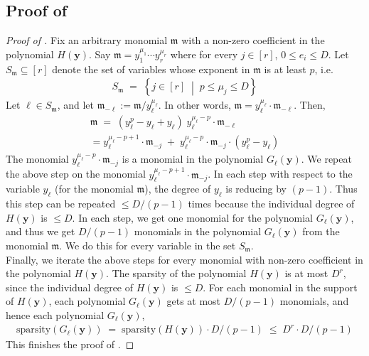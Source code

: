 \documentclass[11pt]{article}
\newcommand{\setcond}[2]{\left\{ #1 \;\middle\vert\; #2 \right\}}
\begin{document}
\subsection{Proof of }\label{app:proof-ind-deg}

\boundedinddegml*

\begin{proof}[Proof of ]
Fix an arbitrary monomial $\mathfrak{m}$ with a non-zero coefficient in the polynomial $H(\mathbf{y})$. Say $\mathfrak{m} = y_{1}^{\mu_{1}} \cdots y_{r}^{\mu_{r}}$ where for every $j \in [r]$, $0 \leq e_{i} \leq D$. Let $S_{\mathfrak{m}} \subseteq [r]$ denote the set of variables whose exponent in $\mathfrak{m}$ is at least $p$, i.e.
\begin{align*}
    S_{\mathfrak{m}} \; = \; \setcond{j \in [r]}{p \leq \mu_{j} \leq D}
\end{align*}
Let $\ell \in S_{\mathfrak{m}}$, and let $\mathfrak{m}_{-\ell} := \mathfrak{m}/y_{\ell}^{\mu_{\ell}}$. In other words, $\mathfrak{m} = y_{\ell}^{\mu_{\ell}} \cdot \mathfrak{m}_{-\ell}$. Then, 
\begin{align*}
    \mathfrak{m} \; = \; (y_{\ell}^{p} - y_{\ell} + y_{\ell}) \; y_{\ell}^{\mu_{\ell} - p} \cdot \mathfrak{m}_{-\ell} \\
    = y_{\ell}^{\mu_{\ell} - p + 1} \cdot \mathfrak{m}_{-j} \; + \; y_{\ell}^{\mu_{\ell} - p} \cdot \mathfrak{m}_{-j} \cdot (y_{\ell}^{p} - y_{\ell})
\end{align*}
The monomial $y_{\ell}^{\mu_{\ell} - p} \cdot \mathfrak{m}_{-j}$ is a monomial in the polynomial $G_{\ell}(\mathbf{y})$. We repeat the above step on the monomial $y_{\ell}^{\mu_{\ell} - p + 1} \cdot \mathfrak{m}_{-j}$. In each step with respect to the variable $y_{\ell}$ (for the monomial $\mathfrak{m}$), the degree of $y_{\ell}$ is reducing by $(p-1)$. Thus this step can be repeated $\leq D/(p-1)$ times because the individual degree of $H(\mathbf{y})$ is $\leq D$. In each step, we get one monomial for the polynomial $G_{\ell}(\mathbf{y})$, and thus we get $D/(p-1)$ monomials in the polynomial $G_{\ell}(\mathbf{y})$ from the monomial $\mathfrak{m}$. We do this for every variable in the set $S_{\mathfrak{m}}$.\\

\noindent
Finally, we iterate the above steps for every monomial with non-zero coefficient in the polynomial $H(\mathbf{y})$. The sparsity of the polynomial $H(\mathbf{y})$ is at most $D^{r}$, since the individual degree of $H(\mathbf{y})$ is $\leq D$. For each monomial in the support of $H(\mathbf{y})$, each polynomial $G_{\ell}(\mathbf{y})$ gets at most $D/(p-1)$ monomials, and hence each polynomial $G_{\ell}(\mathbf{y})$,
\begin{align*}
    \mathrm{sparsity}(G_{\ell}(\mathbf{y})) \; = \; \mathrm{sparsity}(H(\mathbf{y})) \cdot D/(p-1) \; \leq \; D^{r} \cdot D/(p-1)
\end{align*}
This finishes the proof of .
\end{proof}
\end{document}
